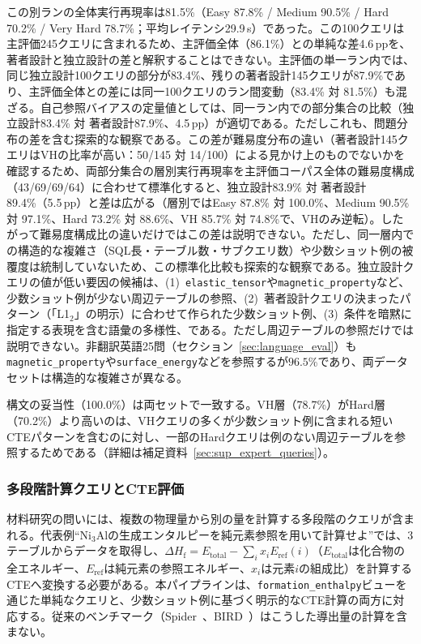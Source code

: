 \documentclass[twocolumn]{interact}
\begin{document}
この別ランの全体実行再現率は81.5\%（Easy 87.8\% / Medium 90.5\% / Hard 70.2\% / Very Hard 78.7\%；平均レイテンシ29.9\,s）であった。この100クエリは主評価245クエリに含まれるため、主評価全体（86.1\%）との単純な差4.6\,ppを、著者設計と独立設計の差と解釈することはできない。主評価の単一ラン内では、同じ独立設計100クエリの部分が83.4\%、残りの著者設計145クエリが87.9\%であり、主評価全体との差には同一100クエリのラン間変動（83.4\% 対 81.5\%）も混ざる。自己参照バイアスの定量値としては、同一ラン内での部分集合の比較（独立設計83.4\% 対 著者設計87.9\%、4.5\,pp）が適切である。ただしこれも、問題分布の差を含む探索的な観察である。この差が難易度分布の違い（著者設計145クエリはVHの比率が高い：50/145 対 14/100）による見かけ上のものでないかを確認するため、両部分集合の層別実行再現率を主評価コーパス全体の難易度構成（43/69/69/64）に合わせて標準化すると、独立設計83.9\% 対 著者設計89.4\%（5.5\,pp）と差は広がる（層別ではEasy 87.8\% 対 100.0\%、Medium 90.5\% 対 97.1\%、Hard 73.2\% 対 88.6\%、VH 85.7\% 対 74.8\%で、VHのみ逆転）。したがって難易度構成比の違いだけではこの差は説明できない。ただし、同一層内での構造的な複雑さ（SQL長・テーブル数・サブクエリ数）や少数ショット例の被覆度は統制していないため、この標準化比較も探索的な観察である。独立設計クエリの値が低い要因の候補は、(1)~\texttt{elastic\_tensor}や\texttt{magnetic\_property}など、少数ショット例が少ない周辺テーブルの参照、(2)~著者設計クエリの決まったパターン（「L1$_2$」の明示）に合わせて作られた少数ショット例、(3)~条件を暗黙に指定する表現を含む語彙の多様性、である。ただし周辺テーブルの参照だけでは説明できない。非翻訳英語25問（セクション~\ref{sec:language_eval}）も\texttt{magnetic\_property}や\texttt{surface\_energy}などを参照するが$96.5$\%であり、両データセットは構造的な複雑さが異なる。

構文の妥当性（100.0\%）は両セットで一致する。VH層（78.7\%）がHard層（70.2\%）より高いのは、VHクエリの多くが少数ショット例に含まれる短いCTEパターンを含むのに対し、一部のHardクエリは例のない周辺テーブルを参照するためである（詳細は補足資料~\ref{sec:sup_expert_queries}）。

\subsubsection{多段階計算クエリとCTE評価}
\label{sec:multistep_query}
\label{sec:cte_eval}

材料研究の問いには、複数の物理量から別の量を計算する多段階のクエリが含まれる。代表例``Ni$_3$Alの生成エンタルピーを純元素参照を用いて計算せよ''では、3テーブルからデータを取得し、$\Delta H_\mathrm{f} = E_\mathrm{total} - \sum_i x_i E_\mathrm{ref}(i)$（$E_\mathrm{total}$は化合物の全エネルギー、$E_\mathrm{ref}$は純元素の参照エネルギー、$x_i$は元素$i$の組成比）を計算するCTEへ変換する必要がある。本パイプラインは、\texttt{formation\_enthalpy}ビューを通じた単純なクエリと、少数ショット例に基づく明示的なCTE計算の両方に対応する。従来のベンチマーク（Spider~\cite{yu2018spider}、BIRD~\cite{li2024bird}）はこうした導出量の計算を含まない。
\end{document}
